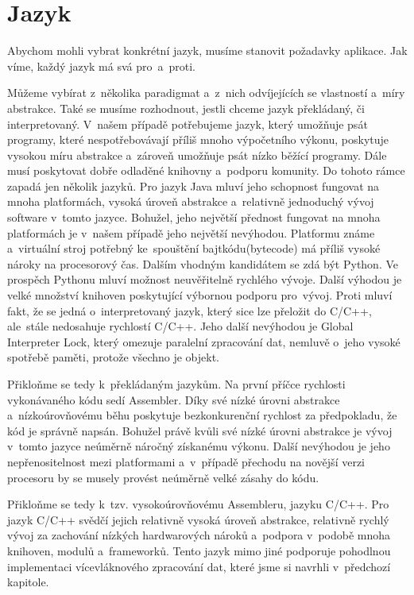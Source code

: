 	\section{Jazyk}
	Abychom mohli vybrat konkrétní jazyk, musíme stanovit požadavky aplikace. Jak víme, každý jazyk má svá pro~a~proti.\par
	Můžeme vybírat z~několika paradigmat a~z~nich odvíjejících se vlastností a~míry abstrakce. Také se musíme rozhodnout, jestli chceme jazyk překládaný, či interpretovaný. V~našem případě potřebujeme jazyk, který umožňuje psát programy, které nespotřebovávají příliš mnoho výpočetního výkonu, poskytuje vysokou míru abstrakce a~zároveň umožňuje psát nízko běžící programy. Dále musí poskytovat dobře odladěné knihovny a~podporu komunity. Do tohoto rámce zapadá jen několik jazyků. Pro jazyk Java mluví jeho schopnost fungovat na mnoha platformách, vysoká úroveň abstrakce a~relativně jednoduchý vývoj software v~tomto jazyce. Bohužel, jeho největší přednost fungovat na mnoha platformách je v~našem případě jeho největší nevýhodou. Platformu známe a~virtuální stroj potřebný ke~spouštění bajtkódu(bytecode) má příliš vysoké nároky na procesorový čas. Dalším vhodným kandidátem se zdá být Python. Ve prospěch Pythonu mluví možnost neuvěřitelně rychlého vývoje. Další výhodou je velké množství knihoven poskytující výbornou podporu pro~vývoj. Proti mluví fakt, že se jedná o~interpretovaný jazyk, který sice lze přeložit do C/C++, ale~stále nedosahuje rychlostí C/C++. Jeho další nevýhodou je Global Interpreter Lock, který omezuje paralelní zpracování dat, nemluvě o~jeho vysoké spotřebě paměti, protože všechno je objekt.\par
	Přikloňme se tedy k~překládaným jazykům. Na první příčce rychlosti vykonávaného kódu sedí Assembler. Díky své nízké úrovni abstrakce a~nízkoúrovňovému běhu poskytuje bezkonkurenční rychlost za předpokladu, že kód je správně napsán. Bohužel právě kvůli své nízké úrovni abstrakce je vývoj v~tomto jazyce neúměrně náročný získanému výkonu. Další nevýhodou je jeho nepřenositelnost mezi platformami a~v~případě přechodu na novější verzi procesoru by se musely provést neúměrně velké zásahy do kódu.\par
	Přikloňme se tedy k~tzv. vysokoúrovňovému Assembleru, jazyku C/C++. Pro jazyk C/C++ svědčí jejich relativně vysoká úroveň abstrakce, relativně rychlý vývoj za zachování nízkých hardwarových nároků a~podpora v~podobě mnoha knihoven, modulů a~frameworků. Tento jazyk mimo jiné podporuje pohodlnou implementaci vícevláknového zpracování dat, které jsme si navrhli v~předchozí kapitole.
	
